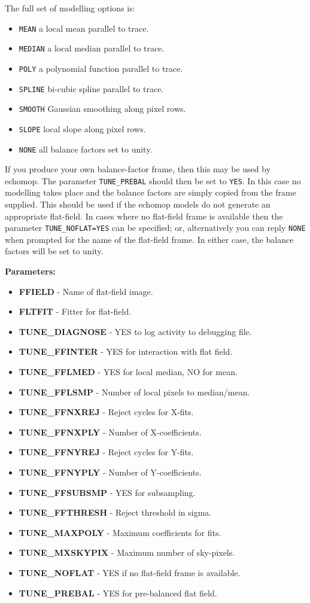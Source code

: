 \documentclass[11pt,twoside]{article}
\makeatletter
\newcommand{\htmlref}[2]{#1}
\newcommand{\myindex}[1]{\index{#1}}
\newcommand{\indexcmdname}[1]{\index{#1@\protect\cmdname{#1}}}
\renewcommand{\myindex}[1]{}
\renewcommand{\indexcmdname}[1]{}
\newcommand{\cmdname}{\begingroup \catcode`\_=12 \realcmdname}
\newcommand{\realcmdname}[1]{\endgroup\texttt{#1}}
\newcommand{\echpars}[1]{
{\bf Parameters:\vspace*{6pt}\\}
    #1
}
\renewcommand{\echpars}[1]{
{\bf Parameters:}
\begin{itemize}
#1
\end{itemize}
}
\newcommand{\epar}[3]
{
    \hspace*{5mm}\makebox[50mm][l]{\bf #1} #2 (p~\pageref{par_#3}.)\\
}
\renewcommand{\epar}[3]
{\item \htmlref{{\bf #1}}{par_#3} - #2}
\newcommand{\lepar}[3]
{
    \hspace*{5mm}\makebox[50mm][l]{\bf #1} #2 (p~\pageref{par_#3}.)
}
\renewcommand{\lepar}[3]
{\item \htmlref{{\bf #1}}{par_#3} - #2}
\makeatother
\begin{document}
The full set of modelling options is:

\begin{itemize}

\item {\verb+MEAN+}   a local mean parallel to trace.

\item {\verb+MEDIAN+} a local median parallel to trace.

\item {\verb+POLY+}   a polynomial function parallel to trace.

\item {\verb+SPLINE+} bi-cubic spline parallel to trace.

\item {\verb+SMOOTH+} Gaussian smoothing along pixel rows.

\item {\verb+SLOPE+}  local slope along pixel rows.

\item {\verb+NONE+}   all balance factors set to unity.

\end{itemize}

\myindex{User-calculated balance factors}
\indexcmdname{TUNE_PREBAL}
If you produce your own balance-factor frame, then this may be used by
{\sc echomop}.
The parameter \htmlref{{\tt TUNE\_PREBAL}}{par_TUNE_PREBAL}
should then be set to \verb+YES+\@.
In this case no modelling takes place and the balance factors are
simply copied from the frame supplied.
This should be used if the {\sc echomop} models do not generate an appropriate
flat-field.\myindex{Flat field!none}\indexcmdname{TUNE_NOFLAT}
In cases where no flat-field frame is available then the parameter
\htmlref{{\tt TUNE\_NOFLAT=YES}}{par_TUNE_NOFLAT} can be specified;
or, alternatively you can reply \verb+NONE+ when prompted for the name of
the flat-field frame.  In either case, the balance factors will be set to
unity.

\echpars{
\epar{FFIELD}{Name of flat-field image.}{FFIELD}
\epar{FLTFIT}{Fitter for flat-field.}{FLTFIT}
\epar{TUNE\_DIAGNOSE}{YES to log activity to debugging file.}{TUNE_DIAGNOSE}
\epar{TUNE\_FFINTER}{YES for interaction with flat field.}{TUNE_FFINTER}
\epar{TUNE\_FFLMED}{YES for local median, NO for mean.}{TUNE_FFLMED}
\epar{TUNE\_FFLSMP}{Number of local pixels to median/mean.}{TUNE_FFLSMP}
\epar{TUNE\_FFNXREJ}{Reject cycles for X-fits.}{TUNE_FFNXREJ}
\epar{TUNE\_FFNXPLY}{Number of X-coefficients.}{TUNE_FFNXPLY}
\epar{TUNE\_FFNYREJ}{Reject cycles for Y-fits.}{TUNE_FFNYREJ}
\epar{TUNE\_FFNYPLY}{Number of Y-coefficients.}{TUNE_FFNYPLY}
\epar{TUNE\_FFSUBSMP}{YES for subsampling.}{TUNE_FFSUBSMP}
\epar{TUNE\_FFTHRESH}{Reject threshold in sigma.}{TUNE_FFTHRESH}
\epar{TUNE\_MAXPOLY}{Maximum coefficients for fits.}{TUNE_MAXPOLY}
\epar{TUNE\_MXSKYPIX}{Maximum number of sky-pixels.}{TUNE_MXSKYPIX}
\epar{TUNE\_NOFLAT}{YES if no flat-field frame is available.}{TUNE_NOFLAT}
\lepar{TUNE\_PREBAL}{YES for pre-balanced flat field.}{TUNE_PREBAL}
}
\end{document}
